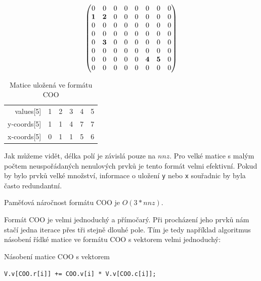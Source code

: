 \begin{align}
\begin{pmatrix}
	0 & 0 & 0 & 0 & 0 & 0 & 0 & 0 \\
	\boldsymbol{1} & \boldsymbol{2} & 0 & 0 & 0 & 0 & 0 & 0 \\
	0 & 0 & 0 & 0 & 0 & 0 & 0 & 0 \\
	0 & 0 & 0 & 0 & 0 & 0 & 0 & 0 \\
	0 & \boldsymbol{3} & 0 & 0 & 0 & 0 & 0 & 0 \\
	0 & 0 & 0 & 0 & 0 & 0 & 0 & 0 \\
	0 & 0 & 0 & 0 & 0 & \boldsymbol{4} & \boldsymbol{5} & 0 \\
	0 & 0 & 0 & 0 & 0 & 0 & 0 & 0 \\	
\end{pmatrix} \notag
\end{align}

\begin{table}[htb]
    \begin{tabular}{r|lllll}
    values[5]   & 1 & 2 & 3 & 4 & 5 \\
    y-coords[5] & 1 & 1 & 4 & 7 & 7 \\
    x-coords[5] & 0 & 1 & 1 & 5 & 6 \\
    \end{tabular}
    \caption{Matice uložená ve formátu COO}
\end{table}

Jak můžeme vidět, délka polí je závislá pouze na $nnz$. Pro velké matice s malým počtem neuspořádaných nenulových prvků je tento formát velmi efektivní. Pokud by bylo prvků velké množství, informace o uložení \texttt{y} nebo \texttt{x} souřadnic by byla často redundantní.

Paměťová náročnost formátu COO je $O(3*nnz)$.

Formát COO je velmi jednoduchý a přímočarý. Při procházení jeho prvků nám stačí jedna iterace přes tři stejně dlouhé pole. Tím je tedy například algoritmus násobení řídké matice ve formátu COO s vektorem velmi jednoduchý:

\begin{algorithm}[htb]
	\caption{Násobení matice COO s vektorem}\label{coo-mvm}
	\begin{algorithmic}[1]
			\State \texttt{V.v[COO.r[i]] += COO.v[i] * V.v[COO.c[i]];	}
		\EndFor
		\EndProcedure
	\end{algorithmic}
\end{algorithm}

